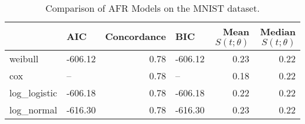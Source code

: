 \begin{table}
\caption{Comparison of AFR Models on the MNIST dataset.}
\label{tab:mnist}
\begin{tabular}{llrlrr}
\toprule
 & AIC & Concordance & BIC & Mean $S(t;\theta)$ & Median $S(t;\theta)$ \\
\midrule
weibull & -606.12 & 0.78 & -606.12 & 0.23 & 0.22 \\
cox & -- & 0.78 & -- & 0.18 & 0.22 \\
log_logistic & -606.18 & 0.78 & -606.18 & 0.22 & 0.22 \\
log_normal & -616.30 & 0.78 & -616.30 & 0.23 & 0.22 \\
\bottomrule
\end{tabular}
\end{table}
